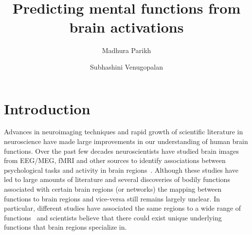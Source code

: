 \documentclass[11pt]{article}
\title{\bf Predicting mental functions from brain activations}
\author{ Madhura Parikh \and Subhashini Venugopalan}
\begin{document}
\date{}
\maketitle

\section{Introduction}

Advances in neuroimaging techniques and rapid growth of scientific literature in neuroscience have made large improvements  in our understanding of human brain functions. 
Over the past few decades neuroscientists have studied brain images from EEG/MEG, fMRI and other sources to identify associations between psychological tasks and activity in brain regions~\cite{10.1371/journal.pcbi.1002707}.
Although these studies have led to large amounts of literature and several discoveries of bodily functions associated with certain brain regions (or networks) the mapping between functions to brain regions and vice-versa still remains largely unclear. In particular, different studies have associated the same regions to a wide range of functions~\cite{10.1371/journal.pcbi.1002707} and scientists believe that there could exist unique underlying functions that brain regions specialize in. 
\end{document}

